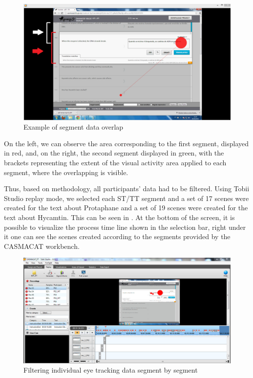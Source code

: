 \documentclass[output=paper]{langsci/langscibook}
\begin{document}
  
\begin{figure}
 \includegraphics[width=\textwidth]{figures/Alves4_neu.png}
 \caption{Example of segment data overlap}
 \label{sarto:fig:4}
\end{figure} 


On the left, we can observe the area corresponding to the first segment, displayed in red, and, on the right, the second segment displayed in green, with the brackets representing the extent of the visual activity area applied to each segment, where the overlapping is visible. 



Thus, based on \citet{alves2012} methodology, all participants' data had to be filtered. Using Tobii Studio replay mode, we selected each ST/TT segment and a set of 17 scenes were created for the text about Protaphane and a set of 19 scenes were created for the text about Hycamtin. This can be seen in .  At the bottom of the screen, it is possible to visualize the process time line shown in the selection bar, right under it one can see the scenes created according to the segments provided by the CASMACAT workbench. 


\begin{figure}
 \includegraphics[width=\textwidth]{figures/Alves5_neu.jpg}
 \caption{Filtering individual eye tracking data segment by segment}
 \label{sarto:fig:5}
\end{figure} 
\end{document}
